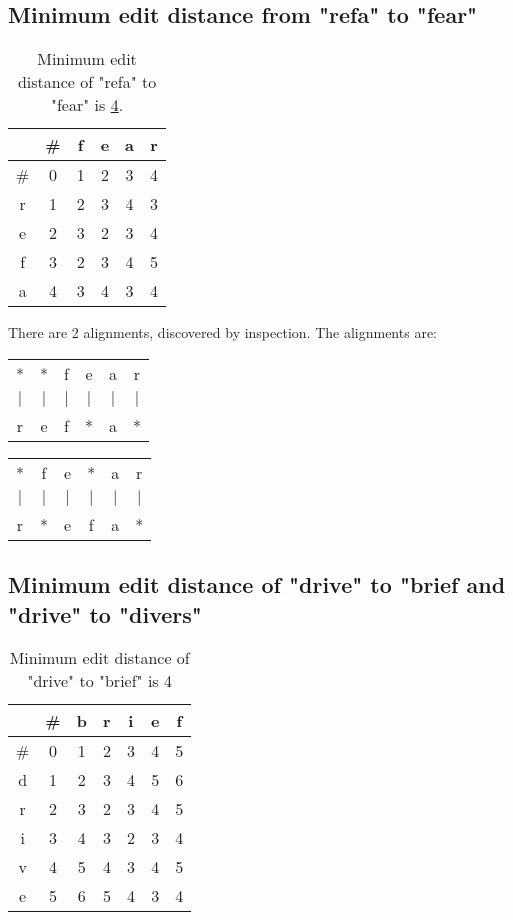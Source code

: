 \documentclass[11pt,journal]{article}
\begin{document}
	\subsection{Minimum edit distance from "refa" to "fear"}
	\begin{table}[h]
		\centering
		\begin{tabular}{c|c c c c c}
			& \# & f & e & a & r \\
			\hline
			\# & 0 & 1 & 2 & 3 & 4 \\
			r & 1 & 2 & 3 & 4 & 3 \\
			e & 2 & 3 & 2 & 3 & 4 \\
			f & 3 & 2 & 3 & 4 & 5 \\
			a & 4 & 3 & 4 & 3 & 4 \\
		\end{tabular}
		\caption{Minimum edit distance of "refa" to "fear" is \underline{4}.}
	\end{table}

	There are 2 alignments, discovered by inspection. The alignments are:
	
	\begin{table}[h]
		\centering
		\begin{tabular}{c c c c c c}
			* & * & f & e & a & r \\
			$\vert$ & $\vert$ & $\vert$ & $\vert$ & $\vert$ & $\vert$ \\
			r & e & f & * & a & * \\
		\end{tabular}
	\end{table}
	
	
		\begin{table}[h]
		\centering
		\begin{tabular}{c c c c c c}
			* & f & e & * & a & r \\
			$\vert$ & $\vert$ & $\vert$ & $\vert$ & $\vert$ & $\vert$ \\
			r & * & e & f & a & *  \\
		\end{tabular}
	\end{table}

	\subsection{Minimum edit distance of "drive" to "brief and "drive" to "divers"}
	\begin{table}[h]
		\centering
		\begin{tabular}{c|c c c c c c}
			& \# & b & r & i & e & f \\
			\hline
			\# & 0 & 1 & 2 & 3 & 4 & 5\\
			 d & 1 & 2 & 3 & 4 & 5 & 6\\
			 r & 2 & 3 & 2 & 3 & 4 & 5\\
			 i & 3 & 4 & 3 & 2 & 3 & 4\\
			 v & 4 & 5 & 4 & 3 & 4 & 5\\
			 e & 5 & 6 & 5 & 4 & 3 & 4\\
			
		\end{tabular}
		\caption{Minimum edit distance of "drive" to "brief" is 4}
	\end{table}
	
\end{document}
